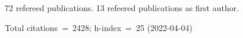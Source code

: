 72 refereed publications. 13 refeered publications as first author.

Total citations~=~2428; h-index~=~25 (2022-04-04)
